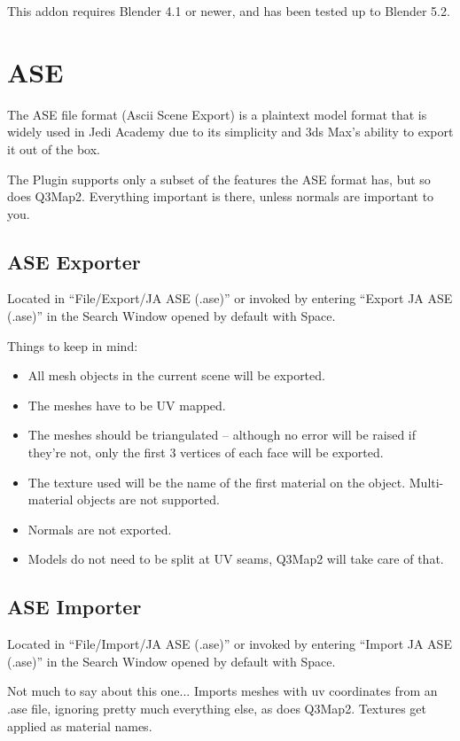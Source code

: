\documentclass[a4paper,10pt]{article}
\begin{document}
 This addon requires Blender 4.1 or newer, and has been tested up to Blender 5.2.

 \section{ASE}
 
 The ASE file format (Ascii Scene Export) is a plaintext model format that is widely used in Jedi Academy due
 to its simplicity and 3ds Max's ability to export it out of the box.
 
 The Plugin supports only a subset of the features the ASE format has, but so does Q3Map2. Everything important
 is there, unless normals are important to you.
 
 \subsection{ASE Exporter}
 
 Located in ``File/Export/JA ASE (.ase)'' or invoked by entering ``Export JA ASE (.ase)'' in the Search Window
 opened by default with Space.
 
 Things to keep in mind:
 \begin{itemize}
  \item All mesh objects in the current scene will be exported.
  \item The meshes have to be UV mapped.
  \item The meshes should be triangulated -- although no error will be raised if they're not, only the first
  3 vertices of each face will be exported.
  \item The texture used will be the name of the first material on the object. Multi-material objects are not
  supported.
  \item Normals are not exported.
  \item Models do not need to be split at UV seams, Q3Map2 will take care of that.
 \end{itemize}
 
 \subsection{ASE Importer}
 
 Located in ``File/Import/JA ASE (.ase)'' or invoked by entering ``Import JA ASE (.ase)'' in the Search Window
 opened by default with Space.
 
 Not much to say about this one... Imports meshes with uv coordinates from an .ase file, ignoring pretty much
 everything else, as does Q3Map2. Textures get applied as material names.
 
\end{document}
